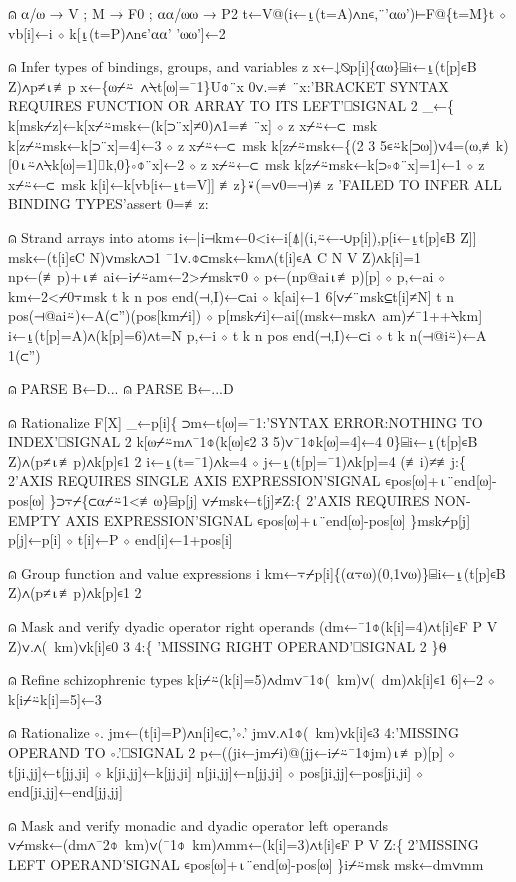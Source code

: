 \documentclass{article}%
\begin{document}
⍝ ⍺/⍵ → V ; M → F0 ; ⍺⍺/⍵⍵ → P2
   t←V@(i←⍸(t=A)∧n∊,¨'⍺⍵')⊢F@\{t=M\}t ⋄ vb[i]←i ⋄ k[⍸(t=P)∧n∊'⍺⍺' '⍵⍵']←2

⍝ Infer types of bindings, groups, and variables
   z x←↓⍉p[i]\{⍺⍵\}⌸i←⍸(t[p]∊B Z)∧p≠⍳≢p
   x←\{⍵⌿⍨~∧⍀t[⍵]=¯1\}U⌽¨x
   0∨.=≢¨x:'BRACKET SYNTAX REQUIRES FUNCTION OR ARRAY TO ITS LEFT'⎕SIGNAL 2
   _←\{
     k[msk⌿z]←k[x⌿⍨msk←(k[⊃¨x]≠0)∧1=≢¨x] ⋄ z x⌿⍨←⊂~msk
     k[z⌿⍨msk←k[⊃¨x]=4]←3 ⋄ z x⌿⍨←⊂~msk
     k[z⌿⍨msk←\{(2 3 5∊⍨k[⊃⍵])∨4=(⍵,≢k)[0⍳⍨∧⍀k[⍵]=1]⌷k,0\}∘⌽¨x]←2 ⋄ z x⌿⍨←⊂~msk
     k[z⌿⍨msk←k[⊃∘⌽¨x]=1]←1 ⋄ z x⌿⍨←⊂~msk
     k[i]←k[vb[i←⍸t=V]]
   ≢z\}⍣(=∨0=⊣)≢z
   'FAILED TO INFER ALL BINDING TYPES'assert 0=≢z:

⍝ Strand arrays into atoms
   i←|i⊣km←0<i←i[⍋|(i,⍨←-∪p[i]),p[i←⍸t[p]∊B Z]]
   msk←(t[i]∊C N)∨msk∧⊃1 ¯1∨.⌽⊂msk←km∧(t[i]∊A C N V Z)∧k[i]=1
   np←(≢p)+⍳≢ai←i⌿⍨am←2>⌿msk⍪0 ⋄ p←(np@ai⍳≢p)[p] ⋄ p,←ai ⋄ km←2<⌿0⍪msk
   t k n pos end(⊣,I)←⊂ai ⋄ k[ai]←1 6[∨⌿¨msk⊆t[i]≠N]
   t n pos(⊣@ai⍨)←A(⊂'')(pos[km⌿i]) ⋄ p[msk⌿i]←ai[(msk←msk∧~am)⌿¯1++⍀km]
   i←⍸(t[p]=A)∧(k[p]=6)∧t=N
   p,←i ⋄ t k n pos end(⊣,I)←⊂i ⋄ t k n(⊣@i⍨)←A 1(⊂'')

⍝ PARSE B←D...
⍝ PARSE B←...D

⍝ Rationalize F[X]
   _←p[i]\{
     ⊃m←t[⍵]=¯1:'SYNTAX ERROR:NOTHING TO INDEX'⎕SIGNAL 2
     k[⍵⌿⍨m∧¯1⌽(k[⍵]∊2 3 5)∨¯1⌽k[⍵]=4]←4
   0\}⌸i←⍸(t[p]∊B Z)∧(p≠⍳≢p)∧k[p]∊1 2
   i←⍸(t=¯1)∧k=4 ⋄ j←⍸(t[p]=¯1)∧k[p]=4
   (≢i)≠≢j:\{
     2'AXIS REQUIRES SINGLE AXIS EXPRESSION'SIGNAL ∊pos[⍵]+⍳¨end[⍵]-pos[⍵]
   \}⊃⍪⌿\{⊂⍺⌿⍨1<≢⍵\}⌸p[j]
   ∨⌿msk←t[j]≠Z:\{
     2'AXIS REQUIRES NON-EMPTY AXIS EXPRESSION'SIGNAL ∊pos[⍵]+⍳¨end[⍵]-pos[⍵]
   \}msk⌿p[j]
   p[j]←p[i] ⋄ t[i]←P ⋄ end[i]←1+pos[i]

⍝ Group function and value expressions
   i km←⍪⌿p[i]\{(⍺⍪⍵)(0,1∨⍵)\}⌸i←⍸(t[p]∊B Z)∧(p≠⍳≢p)∧k[p]∊1 2

⍝ Mask and verify dyadic operator right operands
   (dm←¯1⌽(k[i]=4)∧t[i]∊F P V Z)∨.∧(~km)∨k[i]∊0 3 4:\{
     'MISSING RIGHT OPERAND'⎕SIGNAL 2
   \}⍬

⍝ Refine schizophrenic types
   k[i⌿⍨(k[i]=5)∧dm∨¯1⌽(~km)∨(~dm)∧k[i]∊1 6]←2 ⋄ k[i⌿⍨k[i]=5]←3

⍝ Rationalize ∘.
   jm←(t[i]=P)∧n[i]∊⊂,'∘.'
   jm∨.∧1⌽(~km)∨k[i]∊3 4:'MISSING OPERAND TO ∘.'⎕SIGNAL 2
   p←((ji←jm⌿i)@(jj←i⌿⍨¯1⌽jm)⍳≢p)[p] ⋄ t[ji,jj]←t[jj,ji] ⋄ k[ji,jj]←k[jj,ji]
   n[ji,jj]←n[jj,ji] ⋄ pos[ji,jj]←pos[ji,ji] ⋄ end[ji,jj]←end[jj,jj]

⍝ Mask and verify monadic and dyadic operator left operands
   ∨⌿msk←(dm∧¯2⌽~km)∨(¯1⌽~km)∧mm←(k[i]=3)∧t[i]∊F P V Z:\{
     2'MISSING LEFT OPERAND'SIGNAL ∊pos[⍵]+⍳¨end[⍵]-pos[⍵]
   \}i⌿⍨msk
   msk←dm∨mm
\end{document}
